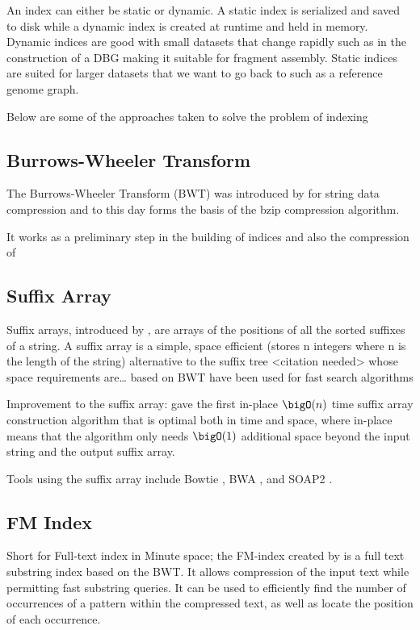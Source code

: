 \documentclass[11pt]{article}
\begin{document}
An index can either be static or dynamic. A static index is serialized and saved
to disk while a dynamic index is created at runtime and held in memory. Dynamic
indices are good with small datasets that change rapidly such as in the
construction of a DBG making it suitable for fragment assembly. Static indices 
are suited for larger datasets that we want to go back to such as a reference
genome graph.

Below are some of the approaches taken to solve the problem of indexing
\subsection{Burrows-Wheeler Transform}
\label{sec:org290e9b3}
The Burrows-Wheeler Transform (BWT) was introduced by
\cite{burrowsBlocksortingLosslessData1994} for string data 
compression and to this day forms the basis of the bzip compression algorithm.

It works as a preliminary step in the building of indices and also the 
compression of 

\subsection{Suffix Array}
\label{sec:org680cdb8}
Suffix arrays, introduced by \cite{manberSuffixArraysNew1990}, are arrays of the
positions of all the sorted suffixes of a string.
A suffix array is a simple, space efficient
(stores n integers where n is the length of the string) alternative to the
suffix tree <citation needed> whose space requirements are\ldots{}
based on BWT have been used for fast search algorithms

Improvement to the suffix array: \cite{liMinimapMiniasmFast2016}
gave the first in-place \(\bigO(n)\) time suffix array construction algorithm that
is optimal both in time and space, where in-place means that the algorithm only
needs \(\bigO(1)\) additional space beyond the input string and the output suffix
array.

Tools using the suffix array include Bowtie
\cite{langmeadUltrafastMemoryefficientAlignment2009}, BWA
\cite{liFastAccurateShort2009}, 
and SOAP2 \cite{liSOAP2ImprovedUltrafast2009}.

\subsection{FM Index}
\label{sec:org9271c21}
Short for Full-text index in Minute space; the FM-index created
by \cite{ferraginaOpportunisticDataStructures2000} is a full text substring index
based on the BWT. It allows compression of the input text while permitting fast
substring queries. It can be used to efficiently find the number of occurrences
of a pattern within the compressed text, as well as locate the position of each
occurrence.
\end{document}
